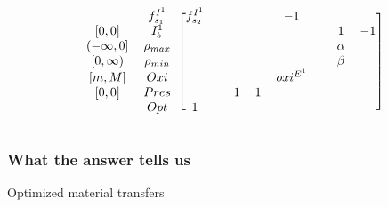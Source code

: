 \documentclass{beamer}
\begin{document}
\begin{frame}[shrink=22]
\begin{equation*}
\begin{blockarray}{cccccccccc}
\begin{block}{cc[cccccccc]}
                               & f_{s_{1}}^{I^{1}} & f_{s_{2}}^{I^{1}} &
                               &                   &                   &
            -1 \\
            {[0,0]}            & I_{b}^{1}         &                   &
                               &                   &                   &
                               &                   & 1                 &
            -1 \\ 
            {(-\infty,0]}      & \rho_{max}        &                   &
                               &                   &                   &
                               &                   & \alpha            &
             \\
            {[0,\infty)}       & \rho_{min}        &                   &
                               &                   &                   &
                               &                   & \beta             & 
             \\
            {[m,M]}        & Oxi               &                   &
                               &                   &                   &
             oxi^{E^{1}}       &                   &                   &
             \\
            {[0,0]}            & Pres              &                   &
                               & 1                 & 1                 &
                               &                   &                   &
             \\
                               & Opt               & 1                 &
                               &                   &                   &
                               &                   &                   &
             \\
            \end{block}
        \end{blockarray}
    \end{equation*}

\end{frame}

\begin{frame}
\frametitle{What the answer tells us}

Optimized material transfers

\end{frame}
\end{document}
